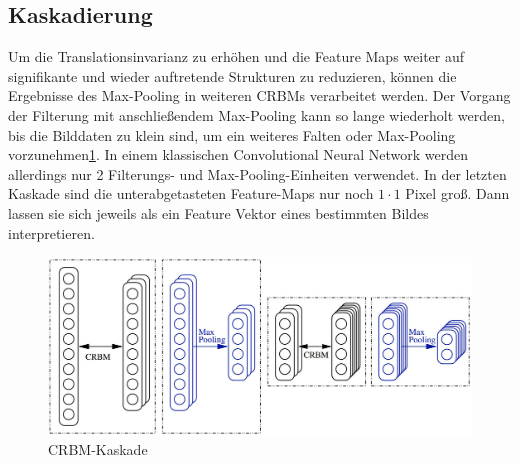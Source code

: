 \subsection{Kaskadierung}
Um die Translationsinvarianz zu erhöhen und die Feature Maps weiter auf signifikante und wieder auftretende Strukturen zu reduzieren, können die Ergebnisse des Max-Pooling in weiteren CRBMs verarbeitet werden. 
Der Vorgang der Filterung mit anschließendem Max-Pooling kann so lange wiederholt werden, bis die Bilddaten zu klein sind, um ein weiteres Falten oder Max-Pooling vorzunehmen\ref{cascade}. In einem klassischen Convolutional Neural Network werden allerdings nur 2 Filterungs- und Max-Pooling-Einheiten verwendet.
In der letzten Kaskade sind die unterabgetasteten Feature-Maps nur noch $1 \cdot 1$ Pixel groß. Dann lassen sie sich jeweils als ein Feature Vektor eines bestimmten Bildes interpretieren.\newline
\begin{figure}[]
                \centering
                \includegraphics[width=2.0\columnwidth]{images/stack.jpg}
                \caption{CRBM-Kaskade \cite{Norouzi09}}
                \label{cascade}
\end{figure}
